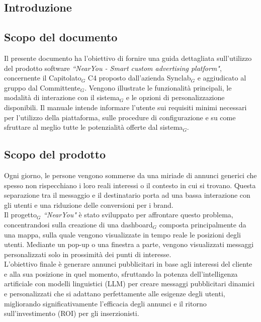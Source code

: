 \documentclass[10pt]{article}
\begin{document}
\newpage
\begin{justify}

\section{Introduzione}
\label{sec:introduzione}

\subsection{Scopo del documento}
Il presente documento ha l'obiettivo di fornire una guida dettagliata sull'utilizzo del prodotto software \textit{``NearYou - Smart custom advertising platform"}, concernente il Capitolato$_G$ C4 proposto dall'azienda Synclab$_G$ e aggiudicato al gruppo dal Committente$_G$. Vengono illustrate le funzionalità principali, le modalità di interazione con il sistema$_G$ e le opzioni di personalizzazione disponibili. Il manuale intende informare l'utente sui requisiti minimi necessari per l'utilizzo della piattaforma, sulle procedure di configurazione e su come sfruttare al meglio tutte le potenzialità offerte dal sistema$_G$.

\subsection{Scopo del prodotto}
Ogni giorno, le persone vengono sommerse da una miriade di annunci generici che spesso non rispecchiano i loro reali interessi o il contesto in cui si trovano. Questa separazione tra il messaggio e il destinatario porta ad una bassa interazione con gli utenti e una riduzione delle conversioni per i brand.\\
Il progetto$_G$ \textit{``NearYou"} è stato sviluppato per affrontare questo problema, concentrandosi sulla creazione di una dashboard$_G$ composta principalmente da una mappa, sulla quale vengono visualizzate in tempo reale le posizioni degli utenti. Mediante un pop-up o una finestra a parte, vengono visualizzati messaggi personalizzati solo in prossimità dei punti di interesse.\\
L'obiettivo finale è generare annunci pubblicitari in base agli interessi del cliente e alla sua posizione in quel momento, sfruttando la potenza dell'intelligenza artificiale con modelli linguistici (LLM) per creare messaggi pubblicitari dinamici e personalizzati che si adattano perfettamente alle esigenze degli utenti, migliorando significativamente l'efficacia degli annunci e il ritorno sull'investimento (ROI) per gli inserzionisti.


\end{justify}
\end{document}

